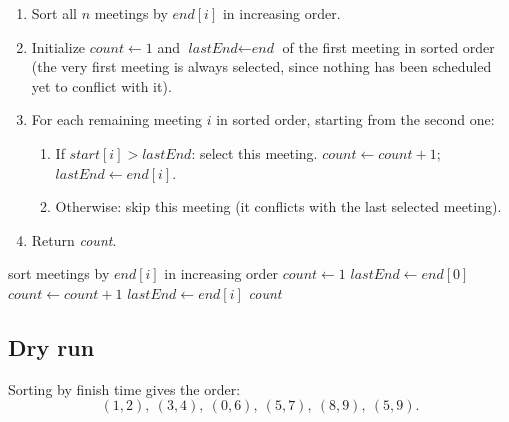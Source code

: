 \begin{enumerate}
  \item Sort all $n$ meetings by $\textit{end}[i]$ in increasing order.
  \item Initialize $\textit{count} \gets 1$ and
        $\textit{lastEnd} \gets \textit{end}$ of the first meeting in
        sorted order (the very first meeting is always selected, since
        nothing has been scheduled yet to conflict with it).
  \item For each remaining meeting $i$ in sorted order, starting from the
        second one:
  \begin{enumerate}
    \item If $\textit{start}[i] > \textit{lastEnd}$: select this meeting.
          $\textit{count} \gets \textit{count} + 1$;
          $\textit{lastEnd} \gets \textit{end}[i]$.
    \item Otherwise: skip this meeting (it conflicts with the last
          selected meeting).
  \end{enumerate}
  \item Return \textit{count}.
\end{enumerate}

\begin{algorithm}[H]
\caption{Maximum Meetings in One Room}
\begin{algorithmic}[1]
  \State sort meetings by $\textit{end}[i]$ in increasing order
  \State $\textit{count} \gets 1$
  \State $\textit{lastEnd} \gets \textit{end}[0]$ 
      \State $\textit{count} \gets \textit{count} + 1$
      \State $\textit{lastEnd} \gets \textit{end}[i]$
    \EndIf
  \EndFor
  \State \Return \textit{count}
\EndProcedure
\end{algorithmic}
\end{algorithm}

\subsection*{Dry run}


Sorting by finish time gives the order:
\[
  (1,2),\ (3,4),\ (0,6),\ (5,7),\ (8,9),\ (5,9).
\]

